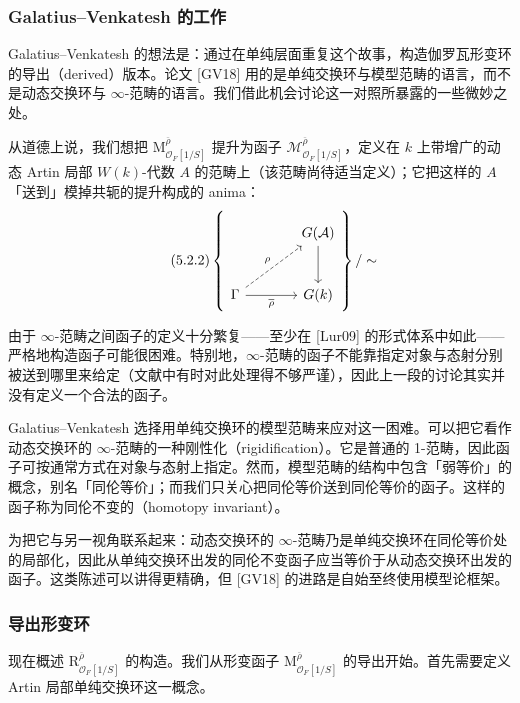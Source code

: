 \subsubsection{Galatius--Venkatesh 的工作}

Galatius--Venkatesh 的想法是：通过在单纯层面重复这个故事，构造伽罗瓦形变环的导出（derived）版本。论文 [GV18] 用的是单纯交换环与模型范畴的语言，而不是动态交换环与 $\infty$-范畴的语言。我们借此机会讨论这一对照所暴露的一些微妙之处。

从道德上说，我们想把 $\mathrm M^{\overline\rho}_{\mathcal O_F[1/S]}$ 提升为函子 $\mathcal M^{\overline\rho}_{\mathcal O_F[1/S]}$，定义在 $k$ 上带增广的动态 Artin 局部 $W(k)$-代数 $A$ 的范畴上（该范畴尚待适当定义）；它把这样的 $A$「送到」模掉共轭的提升构成的 anima：
\begin{equation}\tag{5.2.2}\label{eq:a6-03-4}
\left\{
\begin{tikzcd}[column sep=large, row sep=large]
& G(\mathcal A)\arrow[d]\\
\Gamma\arrow[r,"\overline\rho"']\arrow[ur,"\rho",dashed] & G(k)
\end{tikzcd}
\right\}/\sim
\end{equation}

由于 $\infty$-范畴之间函子的定义十分繁复——至少在 [Lur09] 的形式体系中如此——严格地构造函子可能很困难。特别地，$\infty$-范畴的函子不能靠指定对象与态射分别被送到哪里来给定（文献中有时对此处理得不够严谨），因此上一段的讨论其实并没有定义一个合法的函子。

Galatius--Venkatesh 选择用单纯交换环的模型范畴来应对这一困难。可以把它看作动态交换环的 $\infty$-范畴的一种刚性化（rigidification）。它是普通的 1-范畴，因此函子可按通常方式在对象与态射上指定。然而，模型范畴的结构中包含「弱等价」的概念，别名「同伦等价」；而我们只关心把同伦等价送到同伦等价的函子。这样的函子称为同伦不变的（homotopy invariant）。

为把它与另一视角联系起来：动态交换环的 $\infty$-范畴乃是单纯交换环在同伦等价处的局部化，因此从单纯交换环出发的同伦不变函子应当等价于从动态交换环出发的函子。这类陈述可以讲得更精确，但 [GV18] 的进路是自始至终使用模型论框架。

\subsubsection{导出形变环}

现在概述 $\mathrm R^{\overline\rho}_{\mathcal O_F[1/S]}$ 的构造。我们从形变函子 $\mathrm M^{\overline\rho}_{\mathcal O_F[1/S]}$ 的导出开始。首先需要定义 Artin 局部单纯交换环这一概念。

